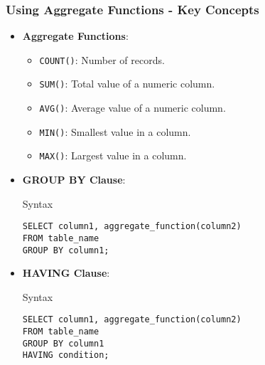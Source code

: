 \documentclass[aspectratio=169]{beamer}
\begin{document}
\begin{frame}[fragile]
    \frametitle{Using Aggregate Functions - Key Concepts}
    \begin{itemize}
        \item \textbf{Aggregate Functions}:
            \begin{itemize}
                \item \texttt{COUNT()}: Number of records.
                \item \texttt{SUM()}: Total value of a numeric column.
                \item \texttt{AVG()}: Average value of a numeric column.
                \item \texttt{MIN()}: Smallest value in a column.
                \item \texttt{MAX()}: Largest value in a column.
            \end{itemize}

        \item \textbf{GROUP BY Clause}:
            \begin{block}{Syntax}
                \begin{lstlisting}
SELECT column1, aggregate_function(column2)
FROM table_name
GROUP BY column1;
                \end{lstlisting}
            \end{block}

        \item \textbf{HAVING Clause}:
            \begin{block}{Syntax}
                \begin{lstlisting}
SELECT column1, aggregate_function(column2)
FROM table_name
GROUP BY column1
HAVING condition;
                \end{lstlisting}
            \end{block}
    \end{itemize}
\end{frame}
\end{document}
